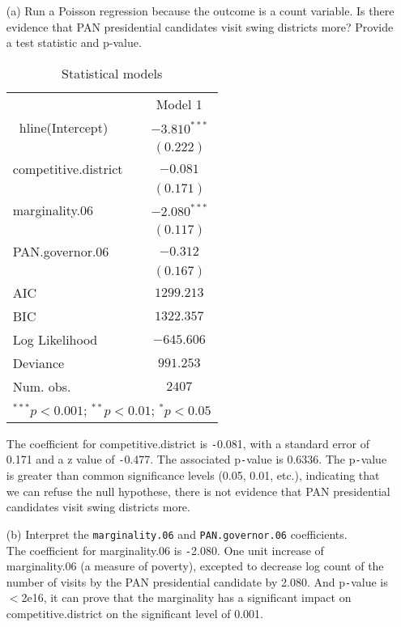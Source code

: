 \documentclass[12pt,letterpaper]{article}
\begin{document}
\begin{enumerate}
	\item [(a)]
	Run a Poisson regression because the outcome is a count variable. Is there evidence that PAN presidential candidates visit swing districts more? Provide a test statistic and p-value.
	\\
	\newpage
	\begin{table}
		\begin{center}
			\begin{tabular}{l c}\hline 
				& Model 1 \\\
				hline(Intercept)          & $-3.810^{***}$ \\                     & $(0.222)$      \\competitive.district & $-0.081$       \\                     & $(0.171)$      \\marginality.06       & $-2.080^{***}$ \\                     & $(0.117)$      \\PAN.governor.06      & $-0.312$       \\                     & $(0.167)$      \\
				\hline
				AIC                  & $1299.213$     \\BIC                  & $1322.357$     \\Log Likelihood       & $-645.606$     \\Deviance             & $991.253$      \\Num. obs.            & $2407$         \\\hline\multicolumn{2}{l}{\scriptsize{$^{***}p<0.001$; $^{**}p<0.01$; $^{*}p<0.05$}}
				\end{tabular}\caption{Statistical models}\label{table:coefficients}
			\end{center}
		\end{table}
		The coefficient for competitive.district is \texttt{-}0.081, with a standard error of 0.171 and a z value of \texttt{-}0.477. The associated p\texttt{-}value is 0.6336. The p\texttt{-}value is greater than common significance levels (0.05, 0.01, etc.), indicating that we can refuse the null hypothese, there is not evidence that PAN presidential candidates visit swing districts more.
 	\item [(b)]
	Interpret the \texttt{marginality.06} and \texttt{PAN.governor.06} coefficients.\\
	The coefficient for marginality.06 is \texttt{-}2.080. One unit increase of marginality.06 (a measure of poverty), excepted to decrease log count of the number of visits by the PAN presidential candidate by 2.080. And p\texttt{-}value is $<$2e16, it can prove that the marginality has a significant impact on competitive.district on the significant level of 0.001.\\

\end{enumerate}
\end{document}
